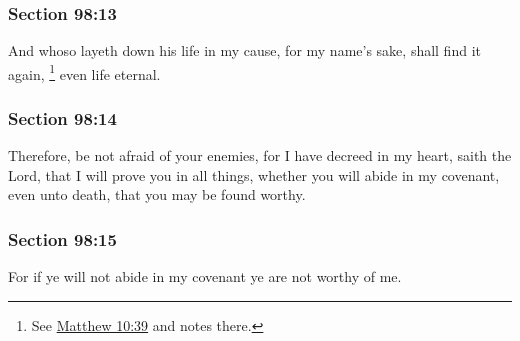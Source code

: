 	\subsubsection{Section 98:13} %
		\label{DC98-13}

		And whoso layeth down his life in my cause, for my name's sake, shall find it again,%
			\footnote{%
				See \hyperref[MATTHEW-10-39]{Matthew 10:39} and notes there.
				}
		even life eternal.


	\subsubsection{Section 98:14} %
		\label{DC98-14}

		Therefore, be not afraid of your enemies, for I have decreed in my heart, saith the Lord, that I will prove you in all things, whether you will abide in my covenant, even unto death, that you may be found worthy.


	\subsubsection{Section 98:15} %
		\label{DC98-15}

		For if ye will not abide in my covenant ye are not worthy of me.


